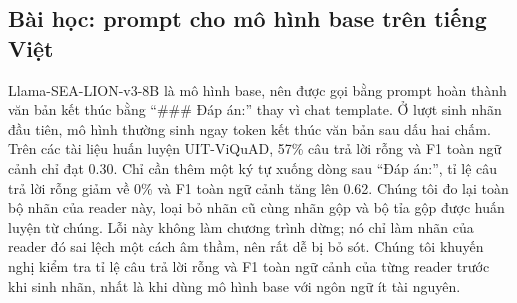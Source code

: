 \documentclass[11pt]{article}
\begin{document}
\subsection{Bài học: prompt cho mô hình base trên tiếng Việt}
\label{sec:base-prompt}
Llama-SEA-LION-v3-8B là mô hình base, nên được gọi bằng prompt hoàn thành văn bản kết thúc bằng
``\#\#\# Đáp án:'' thay vì chat template. Ở lượt sinh nhãn đầu tiên, mô hình thường sinh ngay token kết
thúc văn bản sau dấu hai chấm. Trên các tài liệu huấn luyện UIT-ViQuAD, 57\% câu trả lời rỗng và F1 toàn
ngữ cảnh chỉ đạt 0.30. Chỉ cần thêm một ký tự xuống dòng sau ``Đáp án:'', tỉ lệ câu trả lời rỗng giảm về
0\% và F1 toàn ngữ cảnh tăng lên 0.62. Chúng tôi đo lại toàn bộ nhãn của reader này, loại bỏ nhãn cũ cùng
nhãn gộp và bộ tỉa gộp được huấn luyện từ chúng. Lỗi này không làm chương trình dừng; nó chỉ làm nhãn
của reader đó sai lệch một cách âm thầm, nên rất dễ bị bỏ sót. Chúng tôi khuyến nghị kiểm tra tỉ lệ câu trả lời rỗng và F1 toàn ngữ cảnh của
từng reader trước khi sinh nhãn, nhất là khi dùng mô hình base với ngôn ngữ ít tài nguyên.
\end{document}
